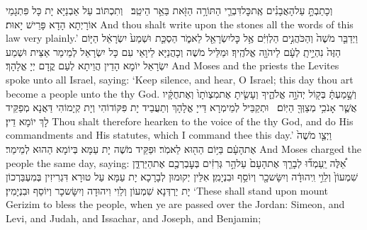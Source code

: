 {וְכָתַבְתָּ֣ עַל\maqqaf הָאֲבָנִ֗ים אֶֽת\maqqaf כׇּל\maqqaf דִּבְרֵ֛י הַתּוֹרָ֥ה הַזֹּ֖את בַּאֵ֥ר הֵיטֵֽב׃ \setuma }
{וְתִכְתּוֹב עַל אַבְנַיָּא יָת כָּל פִּתְגָמֵי אוֹרָיְתָא הָדָא פָּרֵישׁ יָאוּת׃}
{And thou shalt write upon the stones all the words of this law very plainly.’}{}
{וַיְדַבֵּ֤ר מֹשֶׁה֙ וְהַכֹּהֲנִ֣ים הַלְוִיִּ֔ם אֶ֥ל כׇּל\maqqaf יִשְׂרָאֵ֖ל לֵאמֹ֑ר הַסְכֵּ֤ת \pasek  וּשְׁמַע֙ יִשְׂרָאֵ֔ל הַיּ֤וֹם הַזֶּה֙ נִהְיֵ֣יתָֽ לְעָ֔ם לַיהֹוָ֖ה אֱלֹהֶֽיךָ׃}
{וּמַלֵּיל מֹשֶׁה וְכָהֲנַיָּא לֵיוָאֵי עִם כָּל יִשְׂרָאֵל לְמֵימַר אַצֵּית וּשְׁמַע יִשְׂרָאֵל יוֹמָא הָדֵין הֲוֵיתָא לְעַם קֳדָם יְיָ אֱלָהָךְ׃}
{And Moses and the priests the Levites spoke unto all Israel, saying: ‘Keep silence, and hear, O Israel; this day thou art become a people unto the \lord\space thy God.}{}
{וְשָׁ֣מַעְתָּ֔ בְּק֖וֹל יְהֹוָ֣ה אֱלֹהֶ֑יךָ וְעָשִׂ֤יתָ אֶת\maqqaf מִצְוֺתָו֙ וְאֶת\maqqaf חֻקָּ֔יו אֲשֶׁ֛ר אָנֹכִ֥י מְצַוְּךָ֖ הַיּֽוֹם׃ \setuma }
{וּתְקַבֵּיל לְמֵימְרָא דַּייָ אֱלָהָךְ וְתַעֲבֵיד יָת פִּקּוֹדוֹהִי וְיָת קְיָמוֹהִי דַּאֲנָא מְפַקֵּיד לָךְ יוֹמָא דֵין׃}
{Thou shalt therefore hearken to the voice of the \lord\space thy God, and do His commandments and His statutes, which I command thee this day.’}{}
{וַיְצַ֤ו מֹשֶׁה֙ אֶת\maqqaf הָעָ֔ם בַּיּ֥וֹם הַה֖וּא לֵאמֹֽר׃}
{וּפַקֵּיד מֹשֶׁה יָת עַמָּא בְּיוֹמָא הַהוּא לְמֵימַר׃}
{And Moses charged the people the same day, saying:}{}
{אֵ֠לֶּה יַֽעַמְד֞וּ לְבָרֵ֤ךְ אֶת\maqqaf הָעָם֙ עַל\maqqaf הַ֣ר גְּרִזִ֔ים בְּעׇבְרְכֶ֖ם אֶת\maqqaf הַיַּרְדֵּ֑ן שִׁמְעוֹן֙ וְלֵוִ֣י וִֽיהוּדָ֔ה וְיִשָּׂשכָ֖ר וְיוֹסֵ֥ף וּבִנְיָמִֽן׃}
{אִלֵּין יְקוּמוּן לְבָרָכָא יָת עַמָּא עַל טוּרָא דִּגְרִיזִין בְּמִעְבַּרְכוֹן יָת יַרְדְּנָא שִׁמְעוֹן וְלֵוִי וִיהוּדָה וְיִשָּׂשכָר וְיוֹסֵף וּבִנְיָמִין׃}
{‘These shall stand upon mount Gerizim to bless the people, when ye are passed over the Jordan: Simeon, and Levi, and Judah, and Issachar, and Joseph, and Benjamin;}{}
